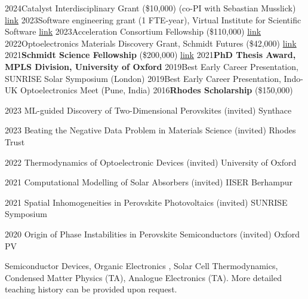 \documentclass{scrartcl}
\begin{document}

\begin{entrylist}
{2024}{Catalyst Interdisciplinary Grant (\$10,000) (co-PI with Sebastian Musslick) \href{https://schmidtsciencefellows.org/news/2023-catalyst-grants-awardees/}{link} }{}
{2023}{Software engineering grant (1 FTE-year), Virtual Institute for Scientific Software \href{https://www.schmidtfutures.com/our-work/virtual-institute-for-scientific-software/}{link} }{}
{2023}{Acceleration Consortium Fellowship (\$110,000) \href{https://acceleration.utoronto.ca/}{link} }{}
{2022}{Optoelectronics Materials Discovery Grant, Schmidt Futures (\$42,000) \href{https://www.schmidtfutures.com/}{link} }{}
{2021}{\textbf{Schmidt Science Fellowship} (\$200,000) \href{https://schmidtsciencefellows.org/}{link} }{}
{2021}{\textbf{PhD Thesis Award, MPLS Division, University of Oxford}}{}
{2019}{Best Early Career Presentation, SUNRISE Solar Symposium (London)}{}
{2019}{Best Early Career Presentation, Indo-UK Optoelectronics Meet (Pune, India)}{}
{2016}{\textbf{Rhodes Scholarship} (\$150,000)}{}
\end{entrylist} 


\begin{entrylist}

\splitentry
{2023}
{ML-guided Discovery of Two-Dimensional Perovskites (invited)}
{Synthace}{}

\splitentry
{2023}
{Beating the Negative Data Problem in Materials Science (invited)}
{Rhodes Trust}{}

\splitentry
{2022}
{Thermodynamics of Optoelectronic Devices (invited)}
{University of Oxford}{}

\splitentry
{2021}
{Computational Modelling of Solar Absorbers (invited)}
{IISER Berhampur}{}

\splitentry
{2021}
{Spatial Inhomogeneities in Perovskite Photovoltaics (invited)}
{SUNRISE Symposium}{}

\splitentry
{2020}
{Origin of Phase Instabilities in Perovskite Semiconductors (invited)}
{Oxford PV}{}




\end{entrylist}



Semiconductor Devices, Organic Electronics , Solar Cell Thermodynamics, Condensed Matter Physics (TA), Analogue Electronics (TA). More detailed teaching history can be provided upon request.\bigskip
\end{document}

